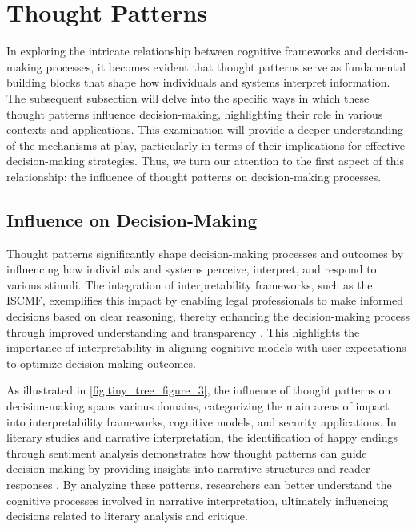 \section{Thought Patterns} \label{sec:Thought Patterns}

In exploring the intricate relationship between cognitive frameworks and decision-making processes, it becomes evident that thought patterns serve as fundamental building blocks that shape how individuals and systems interpret information. The subsequent subsection will delve into the specific ways in which these thought patterns influence decision-making, highlighting their role in various contexts and applications. This examination will provide a deeper understanding of the mechanisms at play, particularly in terms of their implications for effective decision-making strategies. Thus, we turn our attention to the first aspect of this relationship: the influence of thought patterns on decision-making processes.





\subsection{Influence on Decision-Making} \label{subsec:Influence on Decision-Making}

Thought patterns significantly shape decision-making processes and outcomes by influencing how individuals and systems perceive, interpret, and respond to various stimuli. The integration of interpretability frameworks, such as the ISCMF, exemplifies this impact by enabling legal professionals to make informed decisions based on clear reasoning, thereby enhancing the decision-making process through improved understanding and transparency \cite{lin2023interpretabilityframeworksimilarcase}. This highlights the importance of interpretability in aligning cognitive models with user expectations to optimize decision-making outcomes.

As illustrated in \autoref{fig:tiny_tree_figure_3}, the influence of thought patterns on decision-making spans various domains, categorizing the main areas of impact into interpretability frameworks, cognitive models, and security applications. In literary studies and narrative interpretation, the identification of happy endings through sentiment analysis demonstrates how thought patterns can guide decision-making by providing insights into narrative structures and reader responses \cite{jannidis2016analyzingfeaturesdetectionhappy}. By analyzing these patterns, researchers can better understand the cognitive processes involved in narrative interpretation, ultimately influencing decisions related to literary analysis and critique.

